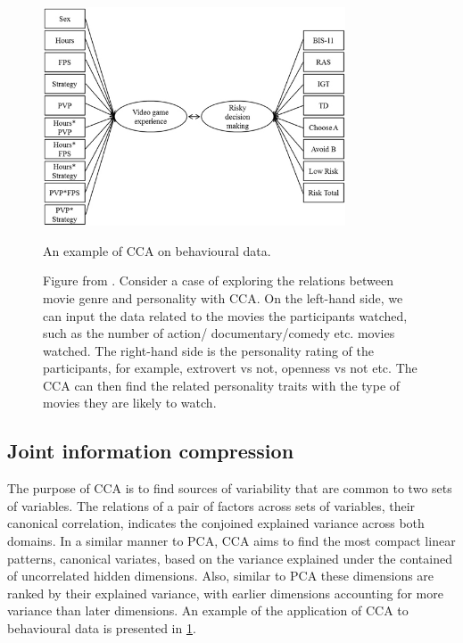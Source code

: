 \begin{figure}[H]
    \centering
    \includegraphics[width=0.8\textwidth]{cca/image/ccafig1.jpg}
    \caption{An example of CCA on behavioural data.}
    \linespacesmall
    \footnotesize
    \caption*{Figure from . Consider a case of exploring the relations between movie genre and personality with CCA. On the left-hand side, we can input the data related to the movies the participants watched, such as the number of action/ documentary/comedy etc. movies watched. The right-hand side is the personality rating of the participants, for example, extrovert vs not, openness vs not etc. The CCA can then find the related personality traits with the type of movies they are likely to watch.}
    \linespacenormal
    \label{fig:methods:fig1}

\end{figure}

\subsection{Joint information compression}
\label{ch:methods:intuitions:1}
 
The purpose of CCA is to find sources of variability that are common to two sets of variables. The relations of a pair of factors across sets of variables, their canonical correlation, indicates the conjoined explained variance across both domains. In a similar manner to PCA, CCA aims to find the most compact linear patterns, canonical variates, based on the variance explained under the contained of uncorrelated hidden dimensions. Also, similar to PCA these dimensions are ranked by their explained variance, with earlier dimensions accounting for more variance than later dimensions. An example of the application of CCA to behavioural data is presented in \cref{fig:methods:fig1}.

